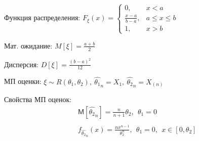 \documentclass[12pt]{article}
\newcommand{\M}{\mathsf{M}}
\begin{document}
\par Функция распределения: $F_{\xi}(x)=\left\{\begin{array}{ll}
        0, & x<a
        \\ \frac{x-a}{b-a}, & a\leqslant x\leqslant b
        \\ 1, & x>b
\end{array}\right.$
\par Мат. ожидание: $M[\xi]=\frac{a+b}{2}$
\par Дисперсия: $D[\xi]=\frac{(b-a)^{2}}{12}$
\par МП оценки: $\xi\sim R(\theta_{1},\theta_{2}),
\ \widehat{\theta_{1}}_{n} = X_{1},
\ \widehat{\theta_{2}}_{n} = X_{(n)}$
\par Свойства МП оценок:
\begin{eqnarray*}
    & & \M [\widehat{\theta_{2}}_{n}] = \frac{n}{n+1}\theta_{2}
    ,\ \ \theta_{1}=0\\
    \\& & f_{\widehat{\theta_{2}}_{n}}(x)=\frac{nx^{n-1}}{\theta_{2}^{n}}
    ,\ \ \theta_{1}=0,\ \ x\in \left[0,\theta_{2}\right]\\
\end{eqnarray*}




\newpage
\end{document}

